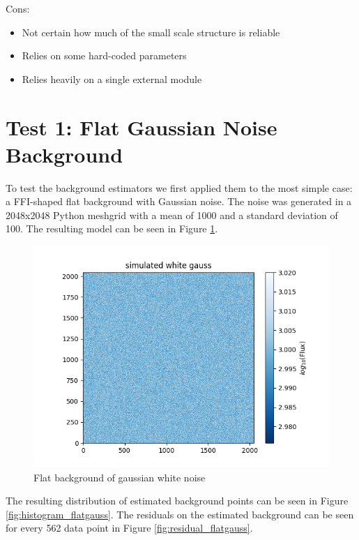 \documentclass[10pt, a4paper]{article}
\begin{document}
Cons:
\begin{itemize}
\item Not certain how much of the small scale structure is reliable
\item Relies on some hard-coded parameters
\item Relies heavily on a single external module
\end{itemize}

\section{Test 1:  Flat Gaussian Noise Background}
To test the background estimators we first applied them to the most simple case: a FFI-shaped flat background with Gaussian noise. The noise was generated in a 2048x2048 Python meshgrid with a mean of 1000 and a standard deviation of 100. The resulting model can be seen in Figure \ref{fig:flatgauss}.\\

\begin{figure}[h!]
\includegraphics[width=\textwidth]{flatgauss}
\caption{Flat background of gaussian white noise}
\label{fig:flatgauss}
\end{figure}

The resulting distribution of estimated background points can be seen in Figure \ref{fig:histogram_flatgauss}. The residuals on the estimated background can be seen for every 562 data point in Figure \ref{fig:residual_flatgauss}.
\end{document}
